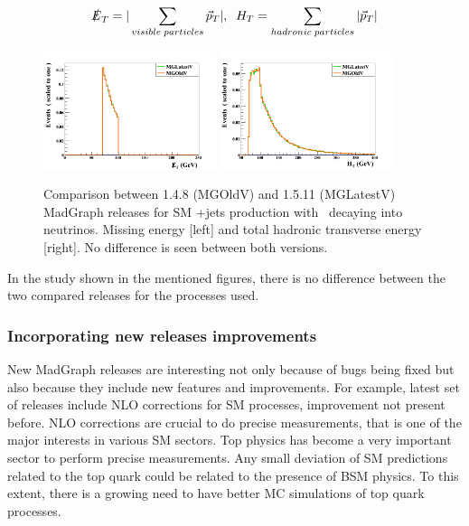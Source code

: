 \begin{equation}
  \label{eq:METHT}
  \slashed{E}_{T}=|\sum_{visible\; particles}\vec{p}_{T}|, \; \; H_{T}=\sum_{hadronic\; particles}|\vec{p}_{T}|
\end{equation}

\begin{figure}[!Hhtbp]
  \begin{center}
    \includegraphics[width=0.45\textwidth]{figs/ZjetsRelVal8.png}
    \includegraphics[width=0.45\textwidth]{figs/ZjetsRelVal9.png}
    \caption{Comparison between 1.4.8 (MGOldV) and 1.5.11 (MGLatestV) MadGraph releases for SM \Z+jets production with \Z~decaying into neutrinos. Missing energy [left] and total hadronic transverse energy [right]. No difference is seen between both versions.}
    \label{fig:ZRelVal2}
  \end{center}
\end{figure}

In the study shown in the mentioned figures, there is no difference between the two compared releases for the processes used.

\subsubsection{Incorporating new releases improvements}

New MadGraph releases are interesting not only because of bugs being fixed but also because they include new features and improvements. For example, latest set of releases include NLO corrections for SM processes, improvement not present before. NLO corrections are crucial to do precise measurements, that is one of the major interests in various SM sectors. Top physics has become a very important sector to perform precise measurements. Any small deviation of SM predictions related to the top quark could be related to the presence of BSM physics. To this extent, there is a growing need to have better MC simulations of top quark processes.


